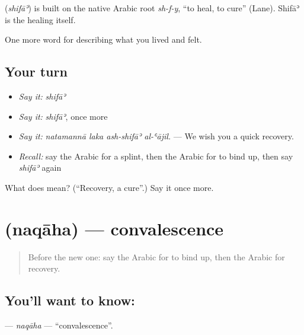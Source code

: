 \begin{cousinweb}
\textbf{} (\emph{shifāʾ}) is built on the native Arabic root \emph{sh-f-y}, \textquotedblleft{}to heal, to cure\textquotedblright{} (Lane). Shifāʾ is the healing itself.
\end{cousinweb}

\begin{grammarlens}[title={What you've built}]
One more word for describing what you lived and felt.
\end{grammarlens}

\subsection*{Your turn}
\begin{itemize}
\raggedright
  \item \emph{Say it:} \emph{shifāʾ}
  \item \emph{Say it:} \emph{shifāʾ}, once more
  \item \emph{Say it:} \emph{natamannā laka ash-shifāʾ al-ʿājil.} — We wish you a quick recovery.
  \item \emph{Recall:} say the Arabic for a splint, then the Arabic for to bind up, then say \emph{shifāʾ} again
\end{itemize}

\begin{tcolorbox}[breakable,colback=teal!4,colframe=teal!35!black,title={Before you move on}]
What does  mean? (\textquotedblleft{}Recovery, a cure\textquotedblright{}.) Say it once more.
\end{tcolorbox}
\section[\texorpdfstring{\ar{نقاهة} (naqāha)}{نقاهة (naqāha)}]{ (naqāha) — convalescence}

\label{lesson:AR-C512-naqaha}



\begin{quote}
Before the new one: say the Arabic for to bind up, then the Arabic for recovery.
\end{quote}

\subsection*{You'll want to know: }
\textbf{} — \emph{naqāha} — \textquotedblleft{}convalescence\textquotedblright{}.

